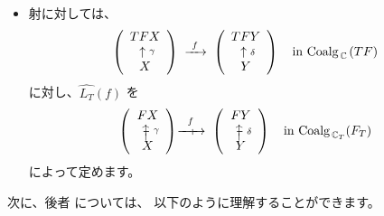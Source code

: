 \documentclass[
		head_space=20mm,
		foot_space=20mm,
		gutter=10mm,
		line_length=190mm
]{jlreq}
\begin{document}
\begin{itemize}
\begin{center}
	\end{center}
	となります。（まさに、\pageref{subsec:Kleisli-approach}ページの「1ステップ遷移を合成して2ステップ遷移を得る操作」に相当します。）\vspace{10pt}
	\item 射に対しては、
	\[\left(\begin{array}{c}TFX\\~\uparrow\substack{\gamma}\\X\end{array}\right)\;\xrightarrow{~f~}\;\left(\begin{array}{c}TFY\\~\uparrow\substack{\delta}\\Y\end{array}\right)\quad\textrm{in $\mathrm{Coalg}_{\,\mathbb{C}\,}(TF)$}\]
	に対し、$\widehat{L_T}(f)$ を
	\[\left(\begin{array}{c}FX\\~\rotatebox{90}{$\!\computationrightarrow$}\;\substack{\gamma}\\X\end{array}\right)
	\;
	\mathrel{~\;{\shortmid}\hspace{-16pt}\xrightarrow{~\;\substack{f\\[-2pt]~}\;~}}
	\;
	\left(\begin{array}{c}FY\\~\rotatebox{90}{$\!\computationrightarrow$}\;\substack{\delta}\\Y\end{array}\right)\quad\textrm{in $\Coalg_{\,\C_T}(F_T)$}\]
	によって定めます。
\end{itemize}

\clearpage

\noindent 次に、後者  については、
以下のように理解することができます。
\vspace{8pt}
\end{document}
